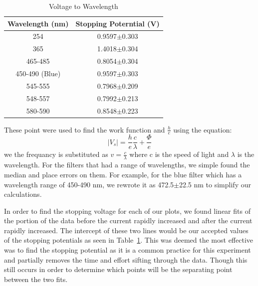 \documentclass[11pt,letterpaper,onecolumn]{article}
\begin{document}
\begin{table}[H]
\centering
\begin{tabular}{|c|c|}
 \hline
 Wavelength (nm) & Stopping Poterntial (V) \\ \hline
 254 & 0.9597$\pm$0.303 \\
 365 & 1.4018$\pm$0.304 \\
 465-485 & 0.8054$\pm$0.304 \\
 450-490 (Blue) & 0.9597$\pm$0.303 \\
 545-555 & 0.7968$\pm$0.209\\
 548-557 & 0.7992$\pm$0.213 \\
 580-590 & 0.8548$\pm$0.223\\
 \hline

\end{tabular}
\caption{Voltage to Wavelength}
\label{tab:data}
\end{table}

These point were used to find the work function and $\frac{h}{e}$ using the equation:
$$|V_s|=\frac{h}{e}\frac{c}{\lambda}+\frac{\Phi{}}{e}$$
we the frequancy is substituted as $v=\frac{c}{\lambda}$ where c is the speed of light and $\lambda$ is the wavelength. For the filters that had a range of wavelengths, we simple found the median and place errors on them. For example, for the blue filter which has a wavelength range of 450-490 nm, we rewrote it as 472.5$\pm$22.5 nm to simplify our calculations. 

In order to find the stopping voltage for each of our plots, we found linear fits of the portion of the data before the current rapidly increased and after the current rapidly increased. The intercept of these two lines would be our accepted values of the stopping potentials as seen in Table~\ref{tab:data}. This was deemed the most effective was to find the stopping potential as it is a common practice for this experiment and partially removes the time and effort sifting through the data. Though this still occurs in order to determine which points will be the separating point between the two fits. 
\end{document}

